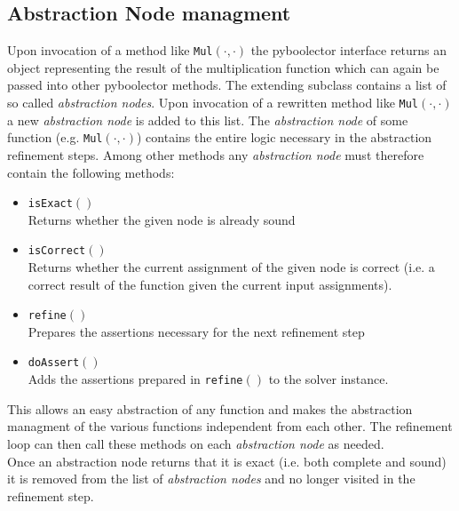 \subsection{Abstraction Node managment}
Upon invocation of a method like \texttt{Mul$\left(\cdot,\cdot\right)$} the pyboolector interface returns an object representing the result of the
multiplication function which can again be passed into other pyboolector methods.
The extending subclass contains a list of so called \textit{abstraction nodes}. Upon invocation of a rewritten method like \texttt{Mul$\left(\cdot,\cdot\right)$} a new \textit{abstraction node}
is added to this list. The \textit{abstraction node} of some function (e.g. \texttt{Mul$\left(\cdot,\cdot\right)$}) contains the entire logic necessary in the abstraction refinement steps.
Among other methods any \textit{abstraction node} must therefore contain the following methods:
\begin{itemize}
    \item \texttt{isExact$\left(\right)$}\\
    Returns whether the given node is already sound
    \item \texttt{isCorrect$\left(\right)$}\\
    Returns whether the current assignment of the given node is correct (i.e. a correct result of the function given the current input assignments).
    \item \texttt{refine$\left(\right)$}\\
    Prepares the assertions necessary for the next refinement step
    \item \texttt{doAssert$\left(\right)$}\\
    Adds the assertions prepared in \texttt{refine$\left(\right)$} to the solver instance.
\end{itemize}
This allows an easy abstraction of any function and makes the abstraction managment of the various functions independent from each other.
The refinement loop can then call these methods on each \textit{abstraction node} as needed.\\
Once an abstraction node returns that it is exact (i.e. both complete and sound) it is removed from the list of \textit{abstraction nodes} and no longer visited in the refinement step.

